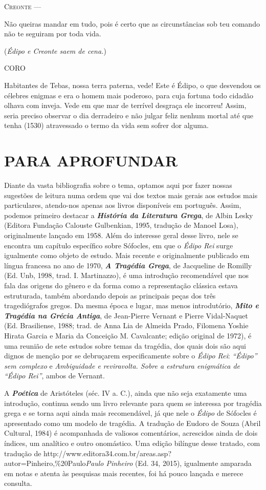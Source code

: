 \textsc{Creonte} ---

Não queiras mandar em tudo, pois é certo que as circunstâncias sob teu
comando não te seguiram por toda vida.

(\emph{Édipo e Creonte saem de cena.})

\textsc{CORO}

Habitantes de Tebas, nossa terra paterna, vede! Este é Édipo, o que
desvendou os célebres enigmas e era o homem mais poderoso, para cuja
fortuna todo cidadão olhava com inveja. Vede em que mar de terrível
desgraça ele incorreu! Assim, seria preciso observar o dia derradeiro e
não julgar feliz nenhum mortal até que tenha (1530) atravessado o termo
da vida sem sofrer dor alguma.

\chapter{PARA APROFUNDAR}

Diante da vasta bibliografia sobre o tema, optamos aqui por fazer nossas
sugestões de leitura numa ordem que vai dos textos mais gerais aos
estudos mais particulares, atendo-nos apenas aos livros disponíveis em
português. Assim, podemos primeiro destacar a \emph{\textbf{História da
Literatura Grega}}, de Albin Lesky (Editora Fundação Calouste
Gulbenkian, 1995, tradução de Manoel Losa), originalmente lançado em
1958. Além do interesse geral desse livro, nele se encontra um capítulo
específico sobre Sófocles, em que o \emph{Édipo Rei} surge igualmente
como objeto de estudo. Mais recente e originalmente publicado em língua
francesa no ano de 1970, \emph{\textbf{A Tragédia Grega}}, de Jacqueline
de Romilly (Ed. Unb, 1998, trad. I. Martinazzo), é uma introdução
recomendável que nos fala das origens do gênero e da forma como a
representação clássica estava estruturada, também abordando depois as
principais peças dos três tragediógrafos gregos. Da mesma época e lugar,
mas menos introdutório, \emph{\textbf{Mito e Tragédia na Grécia
Antiga}}, de Jean-Pierre Vernant e Pierre Vidal-Naquet (Ed. Brasiliense,
1988; trad. de Anna Lia de Almeida Prado, Filomena Yoshie Hirata Garcia
e Maria da Conceição M. Cavalcante; edição original de 1972), é uma
reunião de sete estudos sobre temas da tragédia, dos quais dois são aqui
dignos de menção por se debruçarem especificamente sobre o \emph{Édipo
Rei}: \emph{``Édipo'' sem complexo} e \emph{Ambiguidade e reviravolta.
Sobre a estrutura enigmática de ``Édipo Rei''}, ambos de Vernant.

A \emph{\textbf{Poética}} de Aristóteles (séc. IV a. C.), ainda que não
seja exatamente uma introdução, continua sendo um livro relevante para
quem se interessa por tragédia grega e se torna aqui ainda mais
recomendável, já que nele o \emph{Édipo} de Sófocles é apresentado como
um modelo de tragédia. A tradução de Eudoro de Souza (Abril Cultural,
1984) é acompanhada de valiosos comentários, acrescidos ainda de dois
índices, um analítico e outro onomástico. Uma edição bilíngue desse
tratado, com tradução
de {http://www.editora34.com.br/areas.asp?autor=Pinheiro,\%20Paulo}{\emph{Paulo
Pinheiro}} (Ed. 34, 2015), igualmente amparada em notas e atenta às
pesquisas mais recentes, foi há pouco lançada e merece consulta.

